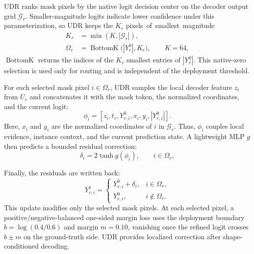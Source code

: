 \documentclass{article}
\begin{document}
\indent UDR ranks mask pixels by the native logit decision center on the decoder output grid $\mathcal{G}_r$. Smaller-magnitude logits indicate lower confidence under this parameterization, so UDR keeps the $K_r$ \mbox{pixels of smallest magnitude}
\begin{equation}
\begin{aligned}
K_r&=\min(K,|\mathcal{G}_r|),\\
\Omega_r&=\operatorname{BottomK}\bigl(|Y_r^0|,K_r\bigr),\qquad K=64,
\end{aligned}
\label{eq:udpr-selection}
\end{equation}
\indent $\operatorname{BottomK}$ returns the indices of the $K_r$ smallest entries of $|Y_r^0|$. This native-zero selection is used only for routing and is independent of the deployment threshold.

\indent For each selected mask pixel $i\in\Omega_r$, UDR samples the local decoder feature $z_i$ from $U_r$ and concatenates it with the mask token, the normalized coordinates, and the current logit:
\begin{equation}
\phi_i=[z_i,t_r,Y^0_{r,i},x_i,y_i,|Y^0_{r,i}|].
\label{eq:udpr-input}
\end{equation}
\indent Here, $x_i$ and $y_i$ are the normalized coordinates of $i$ in $\mathcal{G}_r$. Thus, $\phi_i$ couples local evidence, instance context, and the current prediction state. A lightweight MLP $g$ then predicts a bounded residual correction:
\begin{equation}
\delta_i=2\tanh g(\phi_i),\qquad i\in\Omega_r,
\label{eq:udpr}
\end{equation}

\indent Finally, the residuals are written back:
\begin{equation}
Y^1_{r,i}=\begin{cases}
Y^0_{r,i}+\delta_i, & i\in\Omega_r,\\
Y^0_{r,i}, & i\notin\Omega_r.
\end{cases}
\label{eq:udpr-scatter}
\end{equation}
 \indent This update modifies only the selected mask pixels. At each selected pixel, a positive/negative-balanced one-sided margin loss uses the deployment boundary $b=\log(0.4/0.6)$ and margin $m=0.10$, vanishing once the refined logit crosses $b\pm m$ on the ground-truth side. UDR provides localized correction after shape-conditioned decoding.
\end{document}
